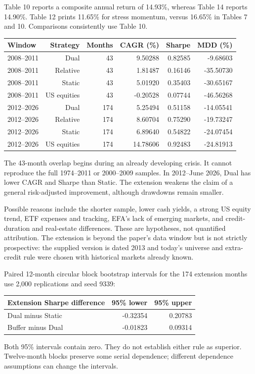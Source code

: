 \documentclass[11pt,letterpaper]{article}
\begin{document}
Table 10 reports a composite annual return of 14.93\%, whereas Table 14 reports 14.90\%. Table 12 prints 11.65\% for stress momentum, versus 16.65\% in Tables 7 and 10. Comparisons consistently use Table 10.
\begin{center}\small\begin{tabular}{lrrrrr}\toprule
Window & Strategy & Months & CAGR (\%) & Sharpe & MDD (\%)\\\midrule
2008--2011 & Dual & 43 & 9.50288 & 0.82585 & -9.68603\\
2008--2011 & Relative & 43 & 1.81487 & 0.16146 & -35.50730\\
2008--2011 & Static & 43 & 5.01920 & 0.35403 & -30.65167\\
2008--2011 & US equities & 43 & -0.20528 & 0.07744 & -46.56268\\
2012--2026 & Dual & 174 & 5.25494 & 0.51158 & -14.05541\\
2012--2026 & Relative & 174 & 8.60704 & 0.75290 & -19.73247\\
2012--2026 & Static & 174 & 6.89640 & 0.54822 & -24.07454\\
2012--2026 & US equities & 174 & 14.78606 & 0.92483 & -24.81913\\
\bottomrule\end{tabular}\end{center}
The 43-month overlap begins during an already developing crisis. It cannot reproduce the full 1974--2011 or 2000--2009 samples. In 2012--June 2026, Dual has lower CAGR and Sharpe than Static. The extension weakens the claim of a general risk-adjusted improvement, although drawdowns remain smaller.

Possible reasons include the shorter sample, lower cash yields, a strong US equity trend, ETF expenses and tracking, EFA's lack of emerging markets, and credit-duration and real-estate differences. These are hypotheses, not quantified attribution. The extension is beyond the paper's data window but is not strictly prospective: the supplied version is dated 2013 and today's universe and extra-credit rule were chosen with historical markets already known.

Paired 12-month circular block bootstrap intervals for the 174 extension months use 2,000 replications and seed 9339:
\begin{center}\small\begin{tabular}{lrr}\toprule
Extension Sharpe difference & 95\% lower & 95\% upper\\\midrule
Dual minus Static & -0.32354 & 0.20783\\
Buffer minus Dual & -0.01823 & 0.09314\\
\bottomrule\end{tabular}\end{center}
Both 95\% intervals contain zero. They do not establish either rule as superior. Twelve-month blocks preserve some serial dependence; different dependence assumptions can change the intervals.
\end{document}
